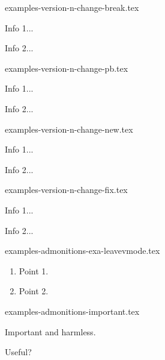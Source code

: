 \begin{filecontents*}[overwrite]{examples-version-n-change-break.tex}
\begin{tdocbreak}
    \item Info 1...
    \item Info 2...
\end{tdocbreak}
\end{filecontents*}


\begin{filecontents*}[overwrite]{examples-version-n-change-pb.tex}
\begin{tdocprob}
    \item Info 1...
    \item Info 2...
\end{tdocprob}
\end{filecontents*}


\begin{filecontents*}[overwrite]{examples-version-n-change-new.tex}
\begin{tdocnew}
    \item Info 1...
    \item Info 2...
\end{tdocnew}
\end{filecontents*}


\begin{filecontents*}[overwrite]{examples-version-n-change-fix.tex}
\begin{tdocfix}
    \item Info 1...
    \item Info 2...
\end{tdocfix}
\end{filecontents*}


\begin{filecontents*}[overwrite]{examples-admonitions-exa-leavevmode.tex}
\begin{tdocexa}
    \leavevmode
    \begin{enumerate}
        \item Point 1.

        \item Point 2.
    \end{enumerate}
\end{tdocexa}
\end{filecontents*}


\begin{filecontents*}[overwrite]{examples-admonitions-important.tex}
\begin{tdocimp}
    Important and harmless.
\end{tdocimp}

\begin{tdocimp}
    Useful?
\end{tdocimp}
\end{filecontents*}


